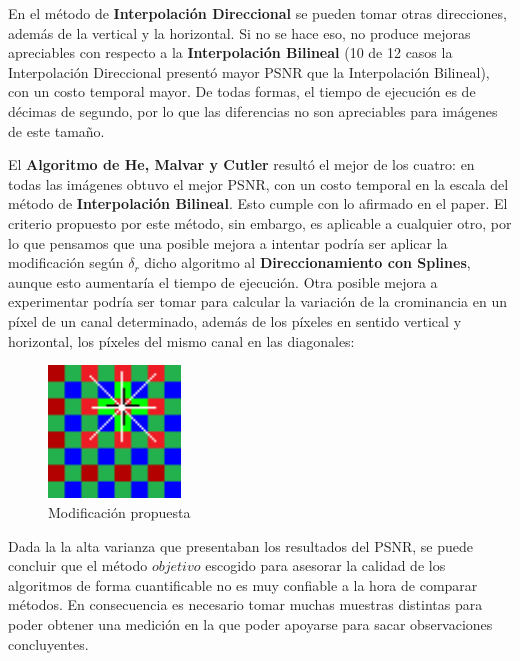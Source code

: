 \documentclass[a4paper]{article}
\begin{document}
En el método de \textbf{Interpolación Direccional} se pueden tomar otras direcciones, además de la vertical y la horizontal. Si no se hace eso, no produce mejoras apreciables con respecto a la \textbf{Interpolación Bilineal} (10 de 12 casos la Interpolación Direccional presentó mayor PSNR que la Interpolación Bilineal), con un costo temporal mayor.
De todas formas, el tiempo de ejecución es de décimas de segundo, por lo que las diferencias no son apreciables para imágenes de este tamaño. %

El \textbf{Algoritmo de He, Malvar y Cutler} resultó el mejor de los cuatro: en todas las imágenes obtuvo el mejor PSNR, con un costo temporal en la escala del método de \textbf{Interpolación Bilineal}. Esto cumple con lo afirmado en el paper. El criterio propuesto por este método, sin embargo, es aplicable a cualquier otro, por lo que pensamos que una posible mejora a intentar podría ser aplicar la modificación según $\delta_r$ dicho algoritmo al \textbf{Direccionamiento con Splines}, aunque esto aumentaría el tiempo de ejecución. Otra posible mejora a experimentar podría ser tomar para calcular la variación de la crominancia en un píxel de un canal determinado, además de los píxeles en sentido vertical y horizontal, los  píxeles del mismo canal en las diagonales: \\ 

\begin{figure}[htbp]
\centering
\includegraphics[width=100pt]{img/BA3Tomo.png}
\caption{Modificación propuesta}
\end{figure}


Dada la la alta varianza que presentaban los resultados del PSNR, se puede concluir que el método $objetivo$ escogido para asesorar la calidad de los algoritmos de forma cuantificable no es muy confiable a la hora de comparar métodos. En consecuencia es necesario tomar muchas muestras distintas para poder obtener una medición en la que poder apoyarse para sacar observaciones concluyentes.\\
\end{document}
